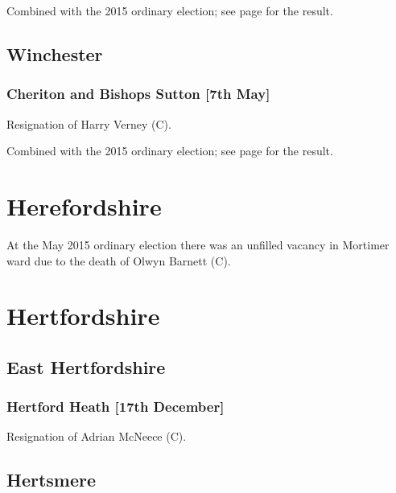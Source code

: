 \documentclass[a4paper,openany]{book}
\begin{document}
\begin{resultsiii}
Combined with the 2015 ordinary election; see page \pageref{WestHeathRushmoor} for the result.

\subsection*{Winchester}

\subsubsection*{Cheriton and Bishops Sutton \hspace*{\fill}\nolinebreak[1]%
\enspace\hspace*{\fill}
[7th May]}


Resignation of Harry Verney (C).

Combined with the 2015 ordinary election; see page \pageref{CheritonBishopsSuttonWinchester} for the result.

\section{Herefordshire}

\noindent
At the May 2015 ordinary election there was an unfilled vacancy in Mortimer ward due to the death of Olwyn Barnett (C).

\section{Hertfordshire}

\subsection*{East Hertfordshire}

\subsubsection*{Hertford Heath \hspace*{\fill}\nolinebreak[1]%
\enspace\hspace*{\fill}
[17th December]}


Resignation of Adrian McNeece (C).

\subsection*{Hertsmere}


\end{resultsiii}
\end{document}
